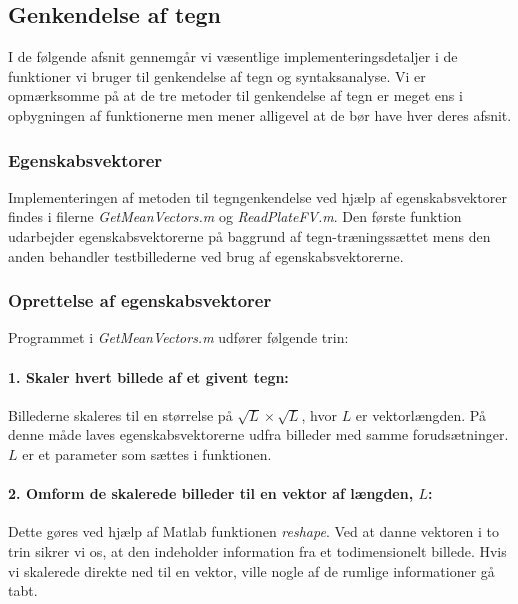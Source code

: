 
\subsection{Genkendelse af tegn}

I de følgende afsnit gennemgår vi væsentlige implementeringsdetaljer i de funktioner vi bruger til genkendelse af tegn og syntaksanalyse. Vi er opmærksomme på at de tre metoder til genkendelse af tegn er meget ens i opbygningen af funktionerne men mener alligevel at de bør have hver deres afsnit.

\subsubsection{Egenskabsvektorer}

Implementeringen af metoden til tegngenkendelse ved hjælp af egenskabsvektorer findes i filerne \textit{GetMeanVectors.m} og \textit{ReadPlateFV.m}. Den første funktion udarbejder egenskabsvektorerne på baggrund af tegn-træningssættet mens den anden behandler testbillederne ved brug af egenskabsvektorerne.

\subsubsection*{Oprettelse af egenskabsvektorer}

Programmet i \textit{GetMeanVectors.m} udfører følgende trin:

\paragraph{1. Skaler hvert billede af et givent tegn:} Billederne skaleres til en størrelse på $\sqrt{L} \times \sqrt{L}$, hvor $L$ er vektorlængden. På denne måde laves egenskabsvektorerne udfra billeder med samme forudsætninger. $L$ er et parameter som sættes i funktionen.

\paragraph{2. Omform de skalerede billeder til en vektor af længden, $L$:} Dette gøres ved hjælp af Matlab funktionen \textit{reshape}. Ved at danne vektoren i to trin sikrer vi os, at den indeholder information fra et todimensionelt billede. Hvis vi skalerede direkte ned til en vektor, ville nogle af de rumlige informationer gå tabt.

